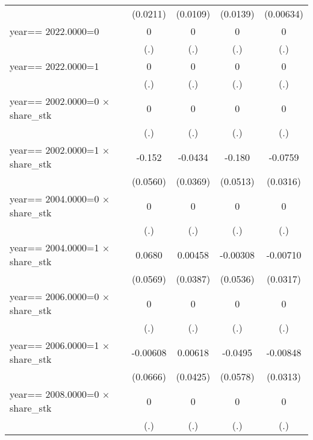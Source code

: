 \begin{table}[htbp]
\begin{tabular}{l*{4}{c}}
                & (0.0211)         & (0.0109)         & (0.0139)         &(0.00634)         \\
year==  2022.0000=0&        0         &        0         &        0         &        0         \\
                &      (.)         &      (.)         &      (.)         &      (.)         \\
year==  2022.0000=1&        0         &        0         &        0         &        0         \\
                &      (.)         &      (.)         &      (.)         &      (.)         \\
year==  2002.0000=0 $\times$ share\_stk&        0         &        0         &        0         &        0         \\
                &      (.)         &      (.)         &      (.)         &      (.)         \\
year==  2002.0000=1 $\times$ share\_stk&   -0.152\sym{***}&  -0.0434         &   -0.180\sym{***}&  -0.0759\sym{**} \\
                & (0.0560)         & (0.0369)         & (0.0513)         & (0.0316)         \\
year==  2004.0000=0 $\times$ share\_stk&        0         &        0         &        0         &        0         \\
                &      (.)         &      (.)         &      (.)         &      (.)         \\
year==  2004.0000=1 $\times$ share\_stk&   0.0680         &  0.00458         & -0.00308         & -0.00710         \\
                & (0.0569)         & (0.0387)         & (0.0536)         & (0.0317)         \\
year==  2006.0000=0 $\times$ share\_stk&        0         &        0         &        0         &        0         \\
                &      (.)         &      (.)         &      (.)         &      (.)         \\
year==  2006.0000=1 $\times$ share\_stk& -0.00608         &  0.00618         &  -0.0495         & -0.00848         \\
                & (0.0666)         & (0.0425)         & (0.0578)         & (0.0313)         \\
year==  2008.0000=0 $\times$ share\_stk&        0         &        0         &        0         &        0         \\
                &      (.)         &      (.)         &      (.)         &      (.)         \\

\end{tabular}
\end{table}
